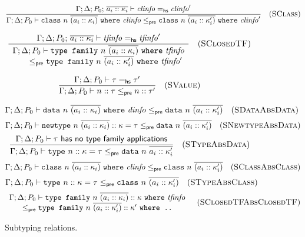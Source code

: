 \begin{figure}
\[
\frac{
\Gamma; \Delta; P_0;\, \overline{a_i :: \kappa_i} \vdash \mathit{clinfo} =_\textsf{hs} \mathit{clinfo}'
}{
\Gamma; \Delta; P_0 \vdash \texttt{class}~n~\overline{(a_i :: \kappa_i)} ~\texttt{where}~ \mathit{clinfo} \le_\textsf{pre} \texttt{class}~n~\overline{(a_i :: \kappa'_i)} ~\texttt{where}~ \mathit{clinfo}'
}
\quad(\textsc{SClass})
\]

\[
\frac{
\Gamma; \Delta; P_0;\, \overline{a_i :: \kappa_i} \vdash \mathit{tfinfo} =_\textsf{hs} \mathit{tfinfo}'
}{
\begin{array}{l}
\Gamma; \Delta; P_0 \vdash \texttt{type family}~n~\overline{(a_i :: \kappa_i)} ~\texttt{where}~ \mathit{tfinfo}
\\ \qquad \le_\textsf{pre} \texttt{type family}~n~\overline{(a_i :: \kappa'_i)} ~\texttt{where}~ \mathit{tfinfo}'
\end{array}
}
\quad(\textsc{SClosedTF})
\]

\[
\frac{
\Gamma; \Delta; P_0 \vdash \tau =_\textsf{hs} \tau'
}{
\Gamma; \Delta; P_0 \vdash n :: \tau \le_\textsf{pre} n :: \tau'
}
\quad(\textsc{SValue})
\]


\begin{mdframed}
\[
\Gamma; \Delta; P_0 \vdash \texttt{data}~n~\overline{(a_i :: \kappa_i)} ~\texttt{where}~ \mathit{dinfo} \le_\textsf{pre} \texttt{data}~n~\overline{(a_i :: \kappa'_i)}
\quad(\textsc{SDataAbsData})
\]
\[
\Gamma; \Delta; P_0 \vdash \texttt{newtype}~n~\overline{(a_i :: \kappa_i)} :: \kappa = \tau \le_\textsf{pre} \texttt{data}~n~\overline{(a_i :: \kappa'_i)}
\quad(\textsc{SNewtypeAbsData})
\]
\[
\frac{
\Gamma; \Delta; P_0 \vdash \tau ~\textsf{has no type family applications}
}{
\Gamma; \Delta; P_0 \vdash \texttt{type}~n :: \kappa = \tau \le_\textsf{pre} \texttt{data}~n~\overline{a_i :: \kappa'_i}
}
\quad(\textsc{STypeAbsData})
\]
\[
\Gamma; \Delta; P_0 \vdash \texttt{class}~n~\overline{(a_i :: \kappa_i)}~\texttt{where}~ \mathit{clinfo} \le_\textsf{pre} \texttt{class}~n~\overline{(a_i :: \kappa'_i)}
\quad(\textsc{SClassAbsClass})
\]
\[
\Gamma; \Delta; P_0 \vdash \texttt{type}~n :: \kappa = \tau \le_\textsf{pre} \texttt{class}~n~\overline{(a_i :: \kappa'_i)}
\quad(\textsc{STypeAbsClass})
\]
\[
\begin{array}{c}
\Gamma; \Delta; P_0 \vdash \texttt{type family}~n~\overline{(a_i :: \kappa_i)} :: \kappa ~\texttt{where}~ \mathit{tfinfo} \\
\le_\textsf{pre} \texttt{type family}~n~\overline{(a_i :: \kappa'_i)} :: \kappa' ~\texttt{where ..}
\end{array}
\quad(\textsc{SClosedTFAbsClosedTF})
\]
\end{mdframed}
\caption{Subtyping relations.}
\end{figure}
